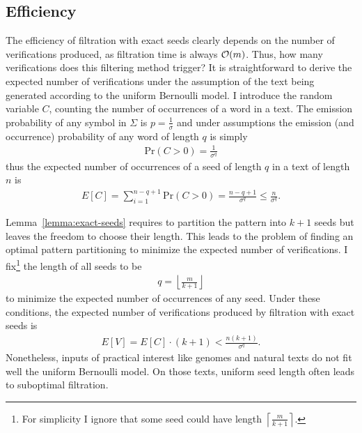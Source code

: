 \subsection{Efficiency}
\label{sec:filtering:exact:efficiency}

The efficiency of filtration with exact seeds clearly depends on the number of verifications produced, as filtration time is always $\mathcal{O}(m)$.
Thus, how many verifications does this filtering method trigger?
It is straightforward to derive the expected number of verifications under the assumption of the text being generated according to the uniform Bernoulli model.
I introduce the random variable $C$, counting the number of occurrences of a word in a text.
The emission probability of any symbol in $\Sigma$ is $p = \frac{1}{\sigma}$ and under \iid assumptions the emission (and occurrence) probability of any word of length $q$ is simply
\begin{eqnarray}
\text{Pr}(C > 0) = \frac{1}{\sigma^q}
\end{eqnarray}
thus the expected number of occurrences of a seed of length $q$ in a text of length $n$ is
\begin{eqnarray}
E[C] = \sum_{i=1}^{n-q+1}{\text{Pr}(C > 0)} = \frac{n - q + 1}{\sigma^q} \leq \frac{n}{\sigma^q}.
\end{eqnarray}

Lemma~\ref{lemma:exact-seeds} requires to partition the pattern into $k+1$ seeds but leaves the freedom to choose their length.
This leads to the problem of finding an optimal pattern partitioning to minimize the expected number of verifications.
I fix\footnote{For simplicity I ignore that some seed could have length $\left \lceil \frac{m}{k+1} \right \rceil$.} the length of all seeds to be
\begin{eqnarray}
\label{eq:seed-len}
q=\left \lfloor \frac{m}{k+1} \right \rfloor
\end{eqnarray}
to minimize the expected number of occurrences of any seed.
Under these conditions, the expected number of verifications produced by filtration with exact seeds is
\begin{eqnarray}
E[V] = E[C] \cdot (k + 1) < \frac{n (k + 1)}{\sigma^q}.
\end{eqnarray}
Nonetheless, inputs of practical interest like genomes and natural texts do not fit well the uniform Bernoulli model.
On those texts, uniform seed length often leads to suboptimal filtration.


